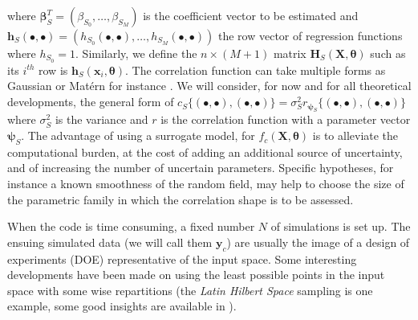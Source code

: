 \documentclass[soumission]{jsfds}
\newcommand{\MCC}[1]{\textcolor{darkyellow}{(mathieu): #1}}
\newcommand{\PB}[1]{\textcolor{green}{PB: #1}}
\begin{document}
where $\boldsymbol{\beta}_S^T=(\beta_{S_0},\dots,\beta_{S_M})$ is the coefficient vector to be estimated and $\boldsymbol{h}_S(\bullet,\bullet)=(h_{S_0}(\bullet,\bullet),\dots\allowbreak,h_{S_M}(\bullet,\bullet))$ the row vector of regression functions where $h_{S_0}=1$. Similarly, we define the $n\times(M+1)$ matrix $\boldsymbol{H}_{S}(\boldsymbol{X},\boldsymbol{\theta})$ such as its $i^{th}$ row is $\boldsymbol{h}_{S}(\boldsymbol{x}_i,\boldsymbol{\theta})$. The correlation function can take multiple forms as Gaussian or Matérn for instance \citep[see][for more examples]{santner2013}.
We will consider, for now and for all theoretical developments, the general form of $c_S\{(\bullet,\bullet),(\bullet,\bullet)\}=\sigma_S^2 r_{\boldsymbol{\psi}_S}\{(\bullet,\bullet),(\bullet,\bullet)\}$ where $\sigma_S^2$ is the variance and $r$ is the correlation function with a parameter vector $\boldsymbol{\psi}_S$. The advantage of using a surrogate model, for $f_c(\boldsymbol{X},\boldsymbol{\theta})$ is to alleviate the computational burden, at the cost of adding an additional source of uncertainty, and of increasing the number of uncertain parameters. Specific hypotheses, for instance a known smoothness of the random field, may help to choose the size of the parametric family in which the correlation
shape is to be assessed. 
\newline

When the code is time consuming, a fixed number $N$ of simulations is set up. The ensuing simulated data (we will call them $\boldsymbol{y}_c$) are usually the image of a design of experiments (DOE) representative of the input space. Some interesting developments have been made on using the least possible points in the input space with some wise repartitions (the \textit{Latin Hilbert Space} sampling is one example, some good insights are available in \citet{pronzato2012}). \newline
\end{document}
